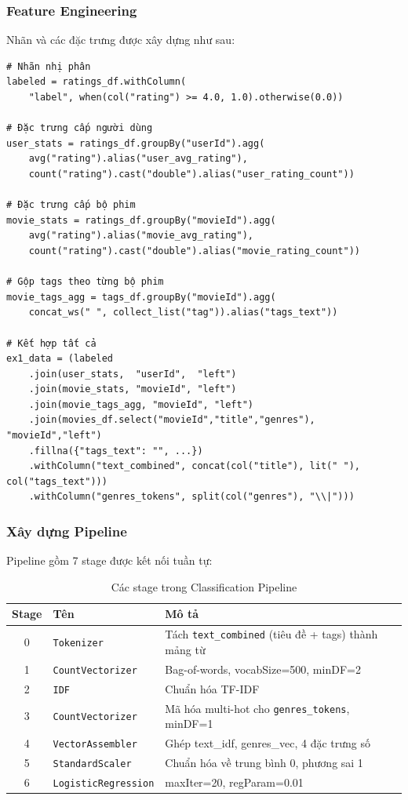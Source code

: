 \subsubsection{Feature Engineering}

Nhãn và các đặc trưng được xây dựng như sau:

\begin{lstlisting}[style=PythonStyle, caption={Tạo nhãn và các đặc trưng tổng hợp}]
# Nhãn nhị phân
labeled = ratings_df.withColumn(
    "label", when(col("rating") >= 4.0, 1.0).otherwise(0.0))

# Đặc trưng cấp người dùng
user_stats = ratings_df.groupBy("userId").agg(
    avg("rating").alias("user_avg_rating"),
    count("rating").cast("double").alias("user_rating_count"))

# Đặc trưng cấp bộ phim
movie_stats = ratings_df.groupBy("movieId").agg(
    avg("rating").alias("movie_avg_rating"),
    count("rating").cast("double").alias("movie_rating_count"))

# Gộp tags theo từng bộ phim
movie_tags_agg = tags_df.groupBy("movieId").agg(
    concat_ws(" ", collect_list("tag")).alias("tags_text"))

# Kết hợp tất cả
ex1_data = (labeled
    .join(user_stats,  "userId",  "left")
    .join(movie_stats, "movieId", "left")
    .join(movie_tags_agg, "movieId", "left")
    .join(movies_df.select("movieId","title","genres"), "movieId","left")
    .fillna({"tags_text": "", ...})
    .withColumn("text_combined", concat(col("title"), lit(" "), col("tags_text")))
    .withColumn("genres_tokens", split(col("genres"), "\\|")))
\end{lstlisting}

\subsubsection{Xây dựng Pipeline}

Pipeline gồm 7 stage được kết nối tuần tự:

\begin{table}[h]
\centering
\begin{tabular}{|c|l|l|}
\hline
\textbf{Stage} & \textbf{Tên} & \textbf{Mô tả} \\
\hline
0 & \texttt{Tokenizer} & Tách \texttt{text\_combined} (tiêu đề + tags) thành mảng từ \\
\hline
1 & \texttt{CountVectorizer} & Bag-of-words, vocabSize=500, minDF=2 \\
\hline
2 & \texttt{IDF} & Chuẩn hóa TF-IDF \\
\hline
3 & \texttt{CountVectorizer} & Mã hóa multi-hot cho \texttt{genres\_tokens}, minDF=1 \\
\hline
4 & \texttt{VectorAssembler} & Ghép text\_idf, genres\_vec, 4 đặc trưng số \\
\hline
5 & \texttt{StandardScaler} & Chuẩn hóa về trung bình 0, phương sai 1 \\
\hline
6 & \texttt{LogisticRegression} & maxIter=20, regParam=0.01 \\
\hline
\end{tabular}
\caption{Các stage trong Classification Pipeline}
\end{table}

